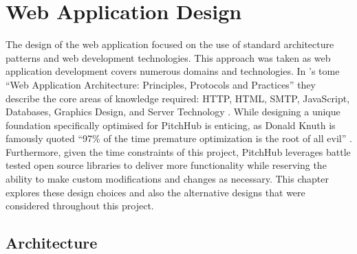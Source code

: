 
\chapter{Web Application Design}\label{C:design_web}
The design of the web application focused on the use of standard architecture patterns and web development technologies. This approach was taken as web application development covers numerous domains and technologies. In \citeauthor{shklar2009web}'s tome ``Web Application Architecture: Principles, Protocols and Practices'' they describe the core areas of knowledge required: HTTP, HTML, SMTP, JavaScript, Databases, Graphics Design, and Server Technology \cite{shklar2009web}. While designing a unique foundation specifically optimised for PitchHub is enticing, as Donald Knuth is famously quoted ``97\% of the time premature optimization is the root of all evil'' \cite{knuth1974structured}. Furthermore, given the time constraints of this project, PitchHub leverages battle tested open source libraries to deliver more functionality while reserving the ability to make custom modifications and changes as necessary. This chapter explores these design choices and also the alternative designs that were considered throughout this project.

\section{Architecture}

